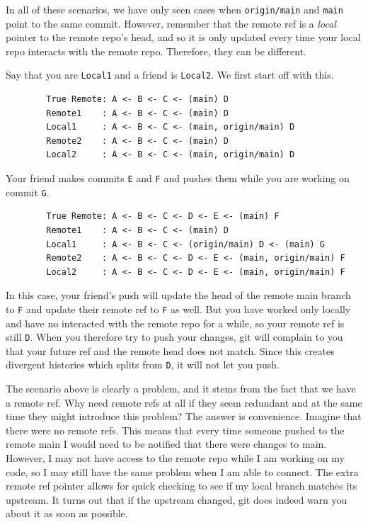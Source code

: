 \documentclass{article}
\begin{document}
    In all of these scenarios, we have only seen cases when \texttt{origin/main} and \texttt{main} point to the same commit. However, remember that the remote ref is a \textit{local} pointer to the remote repo's head, and so it is only updated every time your local repo interacts with the remote repo. Therefore, they can be different. 

    \begin{example}
      Say that you are \texttt{Local1} and a friend is \texttt{Local2}. We first start off with this. 
      \begin{lstlisting}
        True Remote: A <- B <- C <- (main) D
        Remote1    : A <- B <- C <- (main) D 
        Local1     : A <- B <- C <- (main, origin/main) D 
        Remote2    : A <- B <- C <- (main) D
        Local2     : A <- B <- C <- (main, origin/main) D
      \end{lstlisting}
      Your friend makes commits \texttt{E} and \texttt{F} and pushes them while you are working on commit \texttt{G}.  
      \begin{lstlisting}
        True Remote: A <- B <- C <- D <- E <- (main) F
        Remote1    : A <- B <- C <- (main) D 
        Local1     : A <- B <- C <- (origin/main) D <- (main) G
        Remote2    : A <- B <- C <- D <- E <- (main, origin/main) F 
        Local2     : A <- B <- C <- D <- E <- (main, origin/main) F 
      \end{lstlisting} 
      In this case, your friend's push will update the head of the remote main branch to \texttt{F} and update their remote ref to \texttt{F} as well. But you have worked only locally and have no interacted with the remote repo for a while, so your remote ref is still \texttt{D}. When you therefore try to push your changes, git will complain to you that your future ref and the remote head does not match. Since this creates divergent histories which splits from \texttt{D}, it will not let you push. 
    \end{example}

    The scenario above is clearly a problem, and it stems from the fact that we have a remote ref. Why need remote refs at all if they seem redundant and at the same time they might introduce this problem? The answer is convenience. Imagine that there were no remote refs. This means that every time someone pushed to the remote main I would need to be notified that there were changes to main. However, I may not have access to the remote repo while I am working on my code, so I may still have the same problem when I am able to connect. The extra remote ref pointer allows for quick checking to see if my local branch matches its upstream. It turns out that if the upstream changed, git does indeed warn you about it as soon as possible. 
\end{document}
